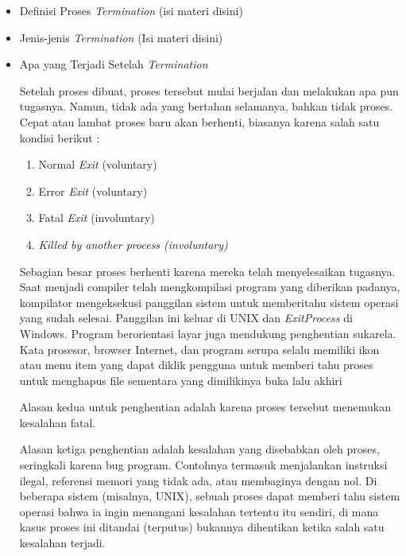 \documentclass[12pt]{article}
\begin{document}
\begin{itemize}
    \item Definisi Proses \textit{Termination}
     (isi materi disini)

    \item Jenis-jenis \textit{Termination}
    (Isi materi disini)

    \item Apa yang Terjadi Setelah \textit{Termination}
    

    Setelah proses dibuat, proses tersebut mulai berjalan dan melakukan apa 
    pun tugasnya. Namun, tidak ada yang bertahan selamanya, bahkan tidak proses. 
    Cepat atau lambat proses baru akan berhenti, biasanya karena salah satu kondisi 
    berikut :

    \begin{enumerate}
        \item Normal \textit{Exit} (voluntary)
        \item Error \textit{Exit} (voluntary)
        \item Fatal \textit{Exit} (involuntary)
        \item \textit{Killed by another process (involuntary)}
    \end{enumerate}

    Sebagian besar proses berhenti karena mereka telah menyelesaikan 
    tugasnya. Saat menjadi compiler telah mengkompilasi program yang diberikan 
    padanya, kompilator mengeksekusi panggilan sistem untuk memberitahu sistem 
    operasi yang sudah selesai. Panggilan ini keluar di UNIX dan \textit{ExitProcess} di 
    Windows. Program berorientasi layar juga mendukung penghentian sukarela. 
    Kata prosesor, browser Internet, dan program serupa selalu memiliki ikon atau 
    menu item yang dapat diklik pengguna untuk memberi tahu proses untuk 
    menghapus file sementara yang dimilikinya buka lalu akhiri

    Alasan kedua untuk penghentian adalah karena proses tersebut 
    menemukan kesalahan fatal.

    Alasan ketiga penghentian adalah kesalahan yang disebabkan oleh 
    proses, seringkali karena bug program. Contohnya termasuk menjalankan 
    instruksi ilegal, referensi memori yang tidak ada, atau membaginya dengan nol. 
    Di beberapa sistem (misalnya, UNIX), sebuah proses dapat memberi tahu sistem 
    operasi bahwa ia ingin menangani kesalahan tertentu itu sendiri, di mana kasus 
    proses ini ditandai (terputus) bukannya dihentikan ketika salah satu kesalahan 
    terjadi.


\end{itemize}
\end{document}
